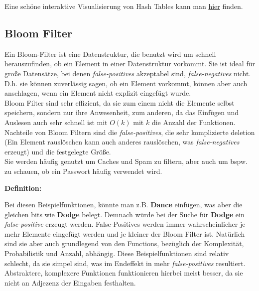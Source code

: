 \documentclass[
../AuD-Zusammenfassung.tex,
]
{subfiles}
\begin{document}
Eine schöne interaktive Visualisierung von Hash Tables kann man \href{https://dsavisualization.com/hash}{hier} finden.

\newpage
\subsection{Bloom Filter}
Ein Bloom-Filter ist eine Datenstruktur, die benutzt wird um schnell herauszufinden, ob ein Element in einer Datenstruktur vorkommt. Sie ist ideal für große Datensätze, bei denen \textit{false-positives} akzeptabel sind, \textit{false-negatives} nicht. D.h. sie können zuverlässig sagen, ob ein Element vorkommt, können aber auch anschlagen, wenn ein Element nicht explizit eingefügt wurde. \\
Bloom Filter sind sehr effizient, da sie zum einem nicht die Elemente selbst speichern, sondern nur ihre Anwesenheit, zum anderen, da das Einfügen und Auslesen auch sehr schnell ist mit $O(k)$ mit $k$ die Anzahl der Funktionen.\\
Nachteile von Bloom Filtern sind die \textit{false-positives}, die sehr komplizierte deletion (Ein Element rauslöschen kann auch anderes rauslöschen, was \textit{false-negatives} erzeugt) und die festgelegte Größe. \\
Sie werden häufig genutzt um Caches und Spam zu filtern, aber auch um bspw. zu schauen, ob ein Passwort häufig verwendet wird.

\textbf{Definition:}

\begin{algorithm}[H]
\end{algorithm}

Bei diesen Beispielfunktionen, könnte man z.B. \textbf{Dance} einfügen, was aber die gleichen bits wie \textbf{Dodge} belegt. Demnach würde bei der Suche für \textbf{Dodge} ein \textit{false-positive} erzeugt werden. False-Positives werden immer wahrscheinlicher je mehr Elemente eingefügt werden und je kleiner der Bloom Filter ist. Natürlich sind sie aber auch grundlegend von den Functions, bezüglich der Komplexität, Probabilistik und Anzahl, abhängig. Diese Beispielfunktionen sind relativ schlecht, da sie simpel sind, was im Endeffekt in mehr \textit{false-positives} resultiert. Abstraktere, komplexere Funktionen funktionieren hierbei meist besser, da sie nicht an Adjezenz der Eingaben festhalten.
\newpage
\end{document}
